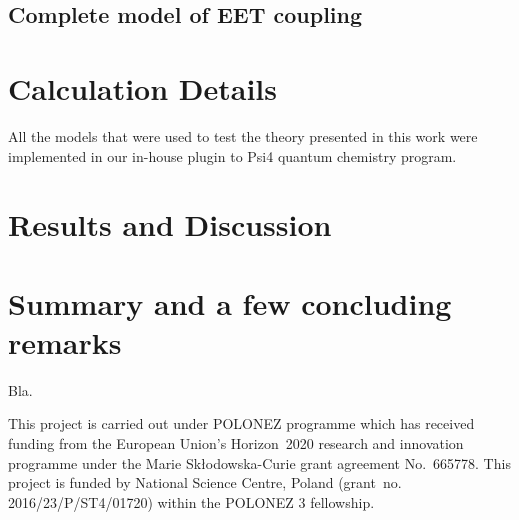 \subsection{\label{s:2.4}Complete model of EET coupling}

\section{\label{s:3}Calculation Details}

All the models that were used to test the theory presented in this work
were implemented in our in\hyp{}house plugin to {\sc Psi4} quantum chemistry program.\cite{Psi4.JCTC.2017}

\section{\label{s:4}Results and Discussion}

\section{\label{s:5}Summary and a few concluding remarks}

Bla.

\begin{acknowledgments}
This project is carried out under POLONEZ programme which has received funding from the European Union's
Horizon~2020 research and innovation programme under the Marie Skłodowska-Curie grant agreement 
No.~665778. This project is funded by National Science Centre, Poland 
(grant~no. 2016/23/P/ST4/01720) within the POLONEZ 3 fellowship.
\end{acknowledgments}





